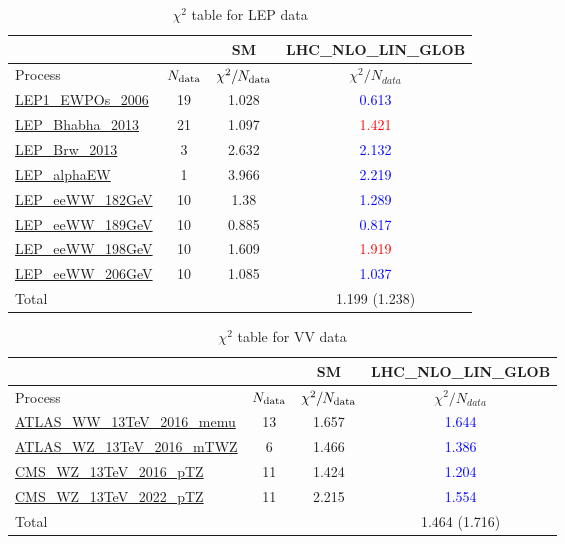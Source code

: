 \documentclass{article}
\begin{document}
\begin{table}[H]
\centering
\begin{tabular}{|l|c|c|c|}
\hline
 \multicolumn{2}{|c|}{} & SM& LHC_NLO_LIN_GLOB\\ \hline
Process & $N_{\rm data}$ & $\chi^ 2/N_{\rm data}$& $\chi^ 2/N_{data}$\\ \hline
\href{https://arxiv.org}{LEP1_EWPOs_2006} & 19 & 1.028 & \textcolor{blue}                            {0.613} \\ \hline
\href{https://arxiv.org}{LEP_Bhabha_2013} & 21 & 1.097 & \textcolor{red}                            {1.421} \\ \hline
\href{https://arxiv.org}{LEP_Brw_2013} & 3 & 2.632 & \textcolor{blue}                            {2.132} \\ \hline
\href{https://arxiv.org}{LEP_alphaEW} & 1 & 3.966 & \textcolor{blue}                            {2.219} \\ \hline
\href{https://arxiv.org}{LEP_eeWW_182GeV} & 10 & 1.38 & \textcolor{blue}                            {1.289} \\ \hline
\href{https://arxiv.org}{LEP_eeWW_189GeV} & 10 & 0.885 & \textcolor{blue}                            {0.817} \\ \hline
\href{https://arxiv.org}{LEP_eeWW_198GeV} & 10 & 1.609 & \textcolor{red}                            {1.919} \\ \hline
\href{https://arxiv.org}{LEP_eeWW_206GeV} & 10 & 1.085 & \textcolor{blue}                            {1.037} \\ \hline
\hline Total & &  & 1.199 (1.238) \\ \hline
\end{tabular}
\caption{$\chi^2$ table for LEP data}
\end{table}
\begin{table}[H]
\centering
\begin{tabular}{|l|c|c|c|}
\hline
 \multicolumn{2}{|c|}{} & SM& LHC_NLO_LIN_GLOB\\ \hline
Process & $N_{\rm data}$ & $\chi^ 2/N_{\rm data}$& $\chi^ 2/N_{data}$\\ \hline
\href{https://arxiv.org}{ATLAS_WW_13TeV_2016_memu} & 13 & 1.657 & \textcolor{blue}                            {1.644} \\ \hline
\href{https://arxiv.org}{ATLAS_WZ_13TeV_2016_mTWZ} & 6 & 1.466 & \textcolor{blue}                            {1.386} \\ \hline
\href{https://arxiv.org}{CMS_WZ_13TeV_2016_pTZ} & 11 & 1.424 & \textcolor{blue}                            {1.204} \\ \hline
\href{https://arxiv.org}{CMS_WZ_13TeV_2022_pTZ} & 11 & 2.215 & \textcolor{blue}                            {1.554} \\ \hline
\hline Total & &  & 1.464 (1.716) \\ \hline
\end{tabular}
\caption{$\chi^2$ table for VV data}
\end{table}
\end{document}
